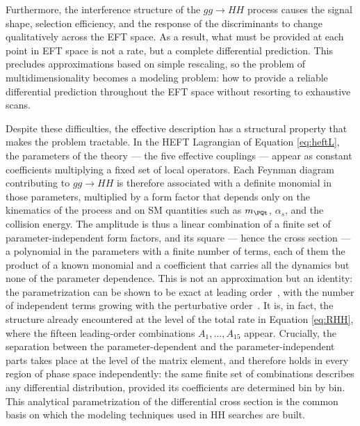 Furthermore, the interference structure of the $gg\to HH$ process causes the signal shape, selection efficiency, and the response of the discriminants to change qualitatively across the EFT space. As a result, what must be provided at each point in EFT space is not a rate, but a complete differential prediction. This precludes approximations based on simple rescaling, so the problem of multidimensionality becomes a modeling problem: how to provide a reliable differential prediction throughout the EFT space without resorting to exhaustive scans.

Despite these difficulties, the effective description has a structural property that makes the problem tractable. In the HEFT Lagrangian of Equation \ref{eq:heftL}, the parameters of the theory — the five effective couplings — appear as constant coefficients multiplying a fixed set of local operators. Each Feynman diagram contributing to $gg\to HH$ is therefore associated with a definite monomial in those parameters, multiplied by a form factor that depends only on the kinematics of the process and on SM quantities such as $m_\PQt$, $\alpha_s$, and the collision energy. The amplitude is thus a linear combination of a finite set of parameter-independent form factors, and its square — hence the cross section — a polynomial in the parameters with a finite number of terms, each of them the product of a known monomial and a coefficient that carries all the dynamics but none of the parameter dependence. This is not an approximation but an identity: the parametrization can be shown to be exact at leading order~\cite{Carvalho:2016rys}, with the number of independent terms growing with the perturbative order~\cite{Buchalla:2018yce}. It is, in fact, the structure already encountered at the level of the total rate in Equation \ref{eq:RHH}, where the fifteen leading-order combinations $A_1,\dots,A_{15}$ appear. Crucially, the separation between the parameter-dependent and the parameter-independent parts takes place at the level of the matrix element, and therefore holds in every region of phase space independently: the same finite set of combinations describes any differential distribution, provided its coefficients are determined bin by bin. This analytical parametrization of the differential cross section is the common basis on which the modeling techniques used in HH searches are built.




